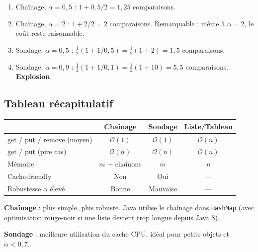 \documentclass[11pt,a4paper]{article}
\newcommand{\bigO}{\mathcal{O}}
\begin{document}
\begin{appliboxR}[Réponse]
\begin{enumerate}[nosep]
    \item Chaînage, $\alpha = 0{,}5$ : $1 + 0{,}5/2 = 1{,}25$ comparaisons.
    \item Chaînage, $\alpha = 2$ : $1 + 2/2 = 2$ comparaisons. Remarquable : même à $\alpha = 2$, le coût reste raisonnable.
    \item Sondage, $\alpha = 0{,}5$ : $\frac{1}{2}(1 + 1/0{,}5) = \frac{1}{2}(1 + 2) = 1{,}5$ comparaisons.
    \item Sondage, $\alpha = 0{,}9$ : $\frac{1}{2}(1 + 1/0{,}1) = \frac{1}{2}(1 + 10) = 5{,}5$ comparaisons. \textbf{Explosion}.
\end{enumerate}
\end{appliboxR}

\subsection{Tableau récapitulatif}

\begin{center}
\renewcommand{\arraystretch}{1.4}
\begin{tabular}{@{}lccc@{}}
\toprule
 & \textbf{Chaînage} & \textbf{Sondage} & \textbf{Liste/Tableau} \\
\midrule
get / put / remove (moyen) & $\bigO(1)$ & $\bigO(1)$ & $\bigO(n)$ \\
get / put (pire cas)        & $\bigO(n)$ & $\bigO(n)$ & $\bigO(n)$ \\
Mémoire                      & $m$ + chaînons & $m$ & $n$ \\
Cache-friendly               & Non & Oui & --- \\
Robustesse $\alpha$ élevé    & Bonne & Mauvaise & --- \\
\bottomrule
\end{tabular}
\end{center}

\begin{retenirbox}[En pratique]
\textbf{Chaînage} : plus simple, plus robuste. Java utilise le chaînage dans \texttt{HashMap} (avec optimisation rouge-noir si une liste devient trop longue depuis Java 8).

\medskip
\textbf{Sondage} : meilleure utilisation du cache CPU, idéal pour petits objets et $\alpha < 0{,}7$.
\end{retenirbox}

\end{document}

